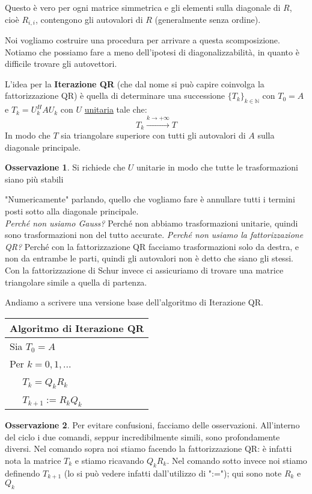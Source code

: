 \documentclass[11pt,a4paper,twoside]{article}
\theoremstyle{definition}
\newtheorem*{oss}{Osservazione}
\begin{document}
Questo è vero per ogni matrice simmetrica e gli elementi sulla diagonale di $R$, cioè $R_{i,i}$, contengono gli autovalori di $R$ (generalmente senza ordine).

Noi vogliamo costruire una procedura per arrivare a questa scomposizione. Notiamo che possiamo fare a meno dell'ipotesi di diagonalizzabilità, in quanto è difficile trovare gli autovettori.

L'idea per la \textbf{Iterazione QR} (che dal nome si può capire coinvolga la fattorizzazione QR) è quella di determinare una successione $\{T_k\}_{k \in \mathbb N}$ con $T_0=A$ e $T_k = U_k^HAU_k$ con $U$ \underline{unitaria} tale che:
\[ T_k \xrightarrow{k \to + \infty} T\]
In modo che $T$ sia triangolare superiore con tutti gli autovalori di $A$ sulla diagonale principale.

\begin{oss}
	Si richiede che $U$ unitarie in modo che tutte le trasformazioni siano più stabili
\end{oss}

"Numericamente" parlando, quello che vogliamo fare è annullare tutti i termini posti sotto alla diagonale principale.\\
\textit{Perché non usiamo Gauss?} Perché non abbiamo trasformazioni unitarie, quindi sono trasformazioni non del tutto accurate. \textit{Perché non usiamo la fattorizzazione QR?} Perché con la fattorizzazione QR facciamo trasformazioni solo da destra, e non da entrambe le parti, quindi gli autovalori non è detto che siano gli stessi. Con la fattorizzazione di Schur invece ci assicuriamo di trovare una matrice triangolare simile a quella di partenza.

Andiamo a scrivere una versione base dell'algoritmo di Iterazione QR.

\begin{tabular}{l}
	\\
	\textbf{Algoritmo di Iterazione QR}\\
	\hline
	Sia $T_0 = A$\\
	Per $k = 0,1,...$\\
	$\quad$ $T_k = Q_kR_k$\\
	$\quad$ $T_{k+1} := R_kQ_k$\\
\end{tabular}

\begin{oss}
	Per evitare confusioni, facciamo delle osservazioni. All'interno del ciclo i due comandi, seppur incredibilmente simili, sono profondamente diversi. Nel comando sopra noi stiamo facendo la fattorizzazione QR: è infatti nota la matrice $T_k$ e stiamo ricavando $Q_kR_k$. Nel comando sotto invece noi stiamo definendo $T_{k+1}$ (lo si può vedere infatti dall'utilizzo di ":="); qui sono note $R_k$ e $Q_k$
\end{oss}
\end{document}
